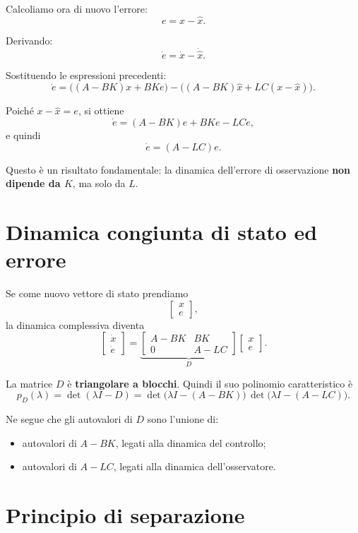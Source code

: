 Calcoliamo ora di nuovo l'errore:
\[
e=x-\hat x.
\]

Derivando:
\[
\dot e = \dot x - \dot{\hat x}.
\]

Sostituendo le espressioni precedenti:
\[
\dot e
=
\bigl((A-BK)x + BK e\bigr)
-
\bigl((A-BK)\hat x + LC(x-\hat x)\bigr).
\]

Poiché \(x-\hat x=e\), si ottiene
\[
\dot e = (A-BK)e + BK e - LC e,
\]
e quindi
\[
\dot e = (A-LC)e.
\]

Questo è un risultato fondamentale:
la dinamica dell'errore di osservazione \textbf{non dipende da \(K\)},
ma solo da \(L\).

\section{Dinamica congiunta di stato ed errore}

Se come nuovo vettore di stato prendiamo
\[
\begin{bmatrix}
x\\
e
\end{bmatrix},
\]
la dinamica complessiva diventa
\[
\begin{bmatrix}
\dot x\\
\dot e
\end{bmatrix}
=
\underbrace{
\begin{bmatrix}
A-BK & BK\\
0 & A-LC
\end{bmatrix}
}_{D}
\begin{bmatrix}
x\\
e
\end{bmatrix}.
\]

La matrice \(D\) è \textbf{triangolare a blocchi}.
Quindi il suo polinomio caratteristico è
\[
p_D(\lambda)
=
\det(\lambda I-D)
=
\det\!\bigl(\lambda I-(A-BK)\bigr)\,
\det\!\bigl(\lambda I-(A-LC)\bigr).
\]

Ne segue che gli autovalori di \(D\) sono l'unione di:
\begin{itemize}
    \item autovalori di \(A-BK\), legati alla dinamica del controllo;
    \item autovalori di \(A-LC\), legati alla dinamica dell'osservatore.
\end{itemize}

\section{Principio di separazione}


